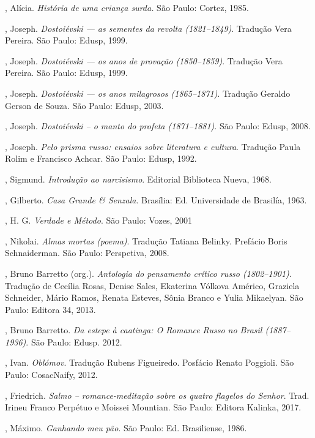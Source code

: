 , Alícia. \emph{História de uma criança surda.} São Paulo: Cortez, 1985.

, Joseph. \emph{Dostoiévski --- as sementes da revolta (1821--1849)}. Tradução Vera Pereira. São Paulo: Edusp, 1999.

, Joseph. \emph{Dostoiévski --- os anos de provação (1850--1859)}. Tradução Vera Pereira. São Paulo: Edusp, 1999.

, Joseph. \emph{Dostoiévski --- os anos milagrosos (1865--1871)}. Tradução Geraldo Gerson de Souza. São Paulo: Edusp, 2003.

, Joseph. \emph{Dostoiévski -- o manto do profeta (1871--1881)}. São Paulo: Edusp, 2008.

, Joseph. \emph{Pelo prisma russo: ensaios sobre literatura e cultura}. Tradução Paula Rolim e Francisco Achcar. São Paulo: Edusp, 1992.

, Sigmund. \emph{Introdução ao narcisismo}. Editorial Biblioteca
Nueva, 1968.

, Gilberto. \emph{Casa Grande \& Senzala}. Brasília: Ed.
Universidade de Brasilía, 1963.

, H. G. \emph{Verdade e Método}. São Paulo: Vozes, 2001

, Nikolai. \emph{Almas mortas (poema)}. Tradução Tatiana Belinky. Prefácio Boris Schnaiderman. São Paulo: Perspetiva, 2008.

, Bruno Barretto (org.). \emph{Antologia do pensamento crítico russo (1802--1901)}. Tradução de Cecília Rosas, Denise Sales, Ekaterina Vólkova Américo, Graziela Schneider, Mário Ramos, Renata Esteves, Sônia Branco e Yulia Mikaelyan. São Paulo: Editora 34, 2013.

, Bruno Barretto. \emph{Da estepe à caatinga: O Romance Russo no Brasil (1887--1936)}. São Paulo:  Edusp. 2012.

, Ivan. \emph{Oblómov}. Tradução Rubens Figueiredo. Posfácio Renato Poggioli.
São Paulo: CosacNaify, 2012.

, Friedrich. \emph{Salmo -- romance-meditação sobre os quatro flagelos do Senhor}. Trad. Irineu Franco Perpétuo e Moissei Mountian. São Paulo: Editora Kalinka, 2017.

, Máximo. \emph{Ganhando meu pão}. São Paulo: Ed. Brasiliense, 1986.

